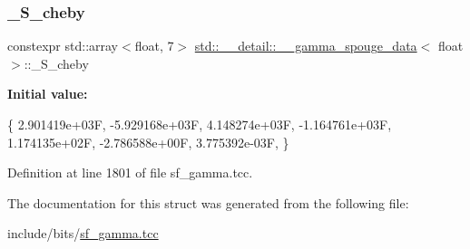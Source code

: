 \subsubsection{\texorpdfstring{\+\_\+\+S\+\_\+cheby}{\_S\_cheby}}
{\footnotesize\ttfamily constexpr std\+::array$<$float, 7$>$ \hyperlink{structstd_1_1____detail_1_1____gamma__spouge__data}{std\+::\+\_\+\+\_\+detail\+::\+\_\+\+\_\+gamma\+\_\+spouge\+\_\+data}$<$ float $>$\+::\+\_\+\+S\+\_\+cheby\hspace{0.3cm}{\ttfamily [static]}}

{\bfseries Initial value\+:}
\begin{DoxyCode}
\{
     2.901419e+03F,
    -5.929168e+03F,
     4.148274e+03F,
    -1.164761e+03F,
     1.174135e+02F,
    -2.786588e+00F,
     3.775392e-03F,
      \}
\end{DoxyCode}


Definition at line 1801 of file sf\+\_\+gamma.\+tcc.



The documentation for this struct was generated from the following file\+:\begin{DoxyCompactItemize}
\item 
include/bits/\hyperlink{sf__gamma_8tcc}{sf\+\_\+gamma.\+tcc}\end{DoxyCompactItemize}

